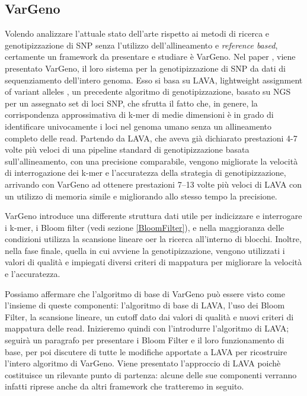 \documentclass[../main.tex]{subfiles}
\begin{document}
\subsection{VarGeno}
Volendo analizzare l’attuale stato dell’arte rispetto ai metodi di ricerca e genotipizzazione di SNP senza l'utilizzo dell'allineamento e \textit{reference based}, certamente un framework da presentare e studiare è VarGeno. Nel paper \cite{sun-medvedev2018vargeno}, viene presentato VarGeno, il loro sistema per la genotipizzazione di SNP da dati di sequenziamento dell’intero genoma. Esso si basa su LAVA, lightweight assignment of variant alleles \cite{shajii2016lava}, un precedente algoritmo di genotipizzazione, basato su NGS per un assegnato set di loci SNP, che sfrutta il fatto che, in genere, la corrispondenza approssimativa di k-mer di medie dimensioni è in grado di identificare univocamente i loci nel genoma umano senza un allineamento completo delle read. Partendo da LAVA, che aveva già dichiarato prestazioni 4-7 volte più veloci di una pipeline standard di genotipizzazione basata sull’allineamento, con una precisione comparabile, vengono migliorate la velocità di interrogazione dei k-mer e l'accuratezza della strategia di genotipizzazione, arrivando con VarGeno ad ottenere prestazioni 7–13 volte più veloci di LAVA con un utilizzo di memoria simile e migliorando allo stesso tempo la precisione.

VarGeno introduce una differente struttura dati utile per indicizzare e interrogare i k-mer, i Bloom filter (vedi sezione \ref{BloomFilter}), e nella maggioranza delle condizioni utilizza la scansione lineare oer la ricerca all'interno di blocchi. Inoltre, nella fase finale, quella in cui avviene la genotipizzazione, vengono utilizzati i valori di qualità e impiegati diversi criteri di mappatura per migliorare la velocità e l'accuratezza. 

Possiamo affermare che l’algoritmo di base di VarGeno può essere visto come l’insieme di queste componenti: l’algoritmo di base di LAVA, l’uso dei Bloom Filter, la scansione lineare, un cutoff dato dai valori di qualità e nuovi criteri di mappatura delle read. Inizieremo quindi con l’introdurre l’algoritmo di LAVA; seguirà un paragrafo per presentare i Bloom Filter e il loro funzionamento di base, per poi discutere di tutte le modifiche apportate a LAVA per ricostruire l’intero algoritmo di VarGeno. Viene presentato l'approccio di LAVA poichè costituisce un rilevante punto di partenza: alcune delle sue componenti verranno infatti riprese anche da altri framework che tratteremo in seguito.
\end{document}
